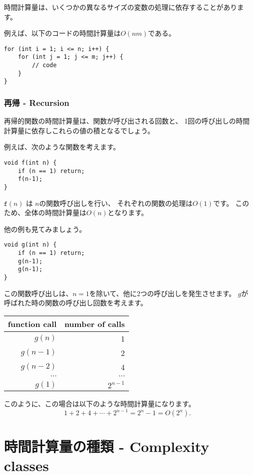 時間計算量は、いくつかの異なるサイズの変数の処理に依存することがあります。

例えば、以下のコードの時間計算量は$O(nm)$である。

\begin{lstlisting}
for (int i = 1; i <= n; i++) {
    for (int j = 1; j <= m; j++) {
        // code
    }
}
\end{lstlisting}

\subsubsection*{再帰 - Recursion}

再帰的関数の時間計算量は、関数が呼び出される回数と、
1回の呼び出しの時間計算量に依存しこれらの値の積となるでしょう。

例えば、次のような関数を考えます。

\begin{lstlisting}
void f(int n) {
    if (n == 1) return;
    f(n-1);
}
\end{lstlisting}
$\texttt{f}(n)$ は $n$の関数呼び出しを行い、
それぞれの関数の処理は$O(1)$です。
このため、全体の時間計算量は$O(n)$となります。

他の例も見てみましょう。
\begin{lstlisting}
void g(int n) {
    if (n == 1) return;
    g(n-1);
    g(n-1);
}
\end{lstlisting}

この関数呼び出しは、$n = 1$を除いて、他に2つの呼び出しを発生させます。
$g$が呼ばれた時の関数の呼び出し回数を考えます。

\begin{center}
\begin{tabular}{rr}
function call & number of calls \\
\hline
$g(n)$ & 1 \\
$g(n-1)$ & 2 \\
$g(n-2)$ & 4 \\
$\cdots$ & $\cdots$ \\
$g(1)$ & $2^{n-1}$ \\
\end{tabular}
\end{center}
このように、この場合は以下のような時間計算量になります。
\[1+2+4+\cdots+2^{n-1} = 2^n-1 = O(2^n).\]

\section{時間計算量の種類 - Complexity classes}

